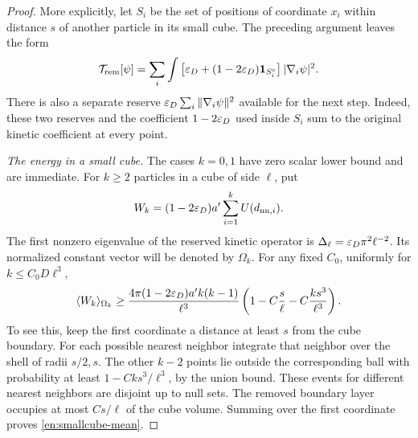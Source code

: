 \begin{proof}
More explicitly, let \(S_i\) be the set of positions of coordinate
\(x_i\) within distance \(s\) of another particle in its small cube.
The preceding argument leaves the form
\begin{equation}\label{en:kinetic-reserve}
 \mathcal T_{\mathrm{rem}}[\psi]
 =\sum_i\int\left[\varepsilon_D+(1-2\varepsilon_D)\mathbf 1_{S_i^c}\right]
                    |\nabla_i\psi|^2.
\end{equation}
There is also a separate reserve \(\varepsilon_D\sum_i\|\nabla_i\psi\|^2\)
available for the next step.  Indeed, these two reserves and the
coefficient \(1-2\varepsilon_D\) used inside \(S_i\) sum to the original
kinetic coefficient at every point.

\emph{The energy in a small cube.}
The cases \(k=0,1\) have zero scalar lower bound and are immediate.
For \(k\ge2\) particles in a cube of side \(\ell\), put
\[
 W_k=(1-2\varepsilon_D)a'\sum_{i=1}^kU(d_{\mathrm{nn},i}).
\]
The first nonzero eigenvalue of the reserved kinetic operator is
\(\Delta_\ell=\varepsilon_D\pi^2\ell^{-2}\).
Its normalized constant vector will be denoted by \(\Omega_k\).
For any fixed \(C_0\), uniformly for
\(k\le C_0D\ell^3\),
\begin{equation}\label{en:smallcube-mean}
 \langle W_k\rangle_{\Omega_k}
 \ge\frac{4\pi(1-2\varepsilon_D)a'k(k-1)}{\ell^3}
       \left(1-C\frac{s}{\ell}
                 -C\frac{ks^3}{\ell^3}\right).
\end{equation}
To see this, keep the first coordinate a distance at least \(s\) from
the cube boundary.  For each possible nearest neighbor integrate that
neighbor over the shell of radii \(s/2,s\).  The other \(k-2\)
points lie outside the corresponding ball with probability at least
\(1-Cks^3/\ell^3\), by the union bound.  These events for different
nearest neighbors are disjoint up to null sets.  The removed boundary
layer occupies at most \(Cs/\ell\) of the cube volume.  Summing
over the first coordinate proves \eqref{en:smallcube-mean}.


\end{proof}

